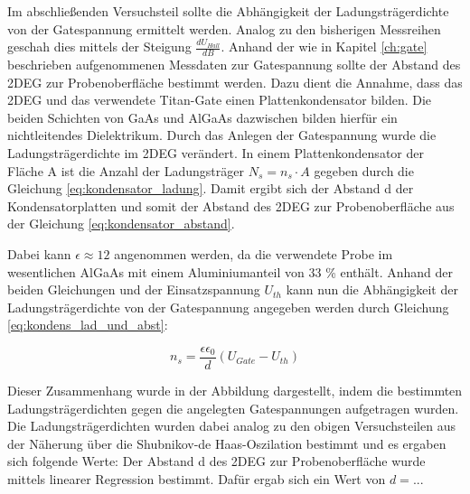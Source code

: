 
Im abschließenden Versuchsteil sollte die Abhängigkeit der Ladungsträgerdichte von der Gatespannung ermittelt werden.
Analog zu den bisherigen Messreihen geschah dies mittels der Steigung $\frac{dU_{Hall}}{dB}$. 
Anhand der wie in Kapitel \ref{ch:gate} beschrieben aufgenommenen Messdaten zur Gatespannung sollte der Abstand des 2DEG zur Probenoberfläche bestimmt werden. Dazu dient die Annahme, dass das 2DEG und das verwendete Titan-Gate einen Plattenkondensator bilden. Die beiden Schichten von GaAs und AlGaAs dazwischen bilden hierfür ein nichtleitendes Dielektrikum. 
Durch das Anlegen der Gatespannung wurde die Ladungsträgerdichte im 2DEG verändert. 
In einem Plattenkondensator der Fläche A ist die Anzahl der Ladungsträger $N_s=n_s \cdot A$ gegeben durch die Gleichung \ref{eq:kondensator_ladung}. 
Damit ergibt sich der Abstand d der Kondensatorplatten und somit der Abstand des 2DEG zur Probenoberfläche aus der Gleichung \ref{eq:kondensator_abstand}. 

Dabei kann $\epsilon \approx 12$ angenommen werden, da die verwendete Probe im wesentlichen AlGaAs mit einem Aluminiumanteil von 33 \% enthält.
Anhand der beiden Gleichungen und der Einsatzspannung $U_{th}$ kann nun die Abhängigkeit der Ladungsträgerdichte von der Gatespannung angegeben werden durch Gleichung \ref{eq:kondens_lad_und_abst}:

\begin{equation}
n_s=\frac{\epsilon \epsilon_0}{d}(U_{Gate}-U_{th})
\end{equation}

Dieser Zusammenhang wurde in der Abbildung %
dargestellt, indem die bestimmten Ladungsträgerdichten gegen die angelegten Gatespannungen aufgetragen wurden. 
Die Ladungsträgerdichten wurden dabei analog zu den obigen Versuchsteilen aus der Näherung über die Shubnikov-de Haas-Oszilation %
bestimmt und es ergaben sich folgende Werte: %
Der Abstand d des 2DEG zur Probenoberfläche wurde mittels linearer Regression bestimmt. Dafür ergab sich ein Wert von $d=...$ %


